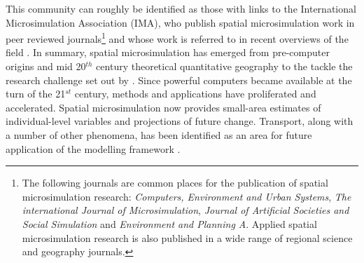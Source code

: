 This community can roughly be identified as those with links
to the International Microsimulation Association (IMA), 
who publish spatial microsimulation work in peer reviewed
journals\footnote{The following journals are common places for the
publication of spatial microsimulation research:
\emph{Computers, Environment and Urban Systems},
\emph{The international Journal of Microsimulation},
\emph{Journal of Artificial Societies and Social Simulation} and
\emph{Environment and Planning A}. Applied spatial microsimulation
research is also published in a wide range of regional science
and geography journals.
}
and whose work is referred to in recent overviews of the field
\citep{Tanton2013, O'Donoghue2013}.
In summary, spatial microsimulation has emerged
from pre-computer origins and mid 20$^{th}$ century theoretical quantitative
geography to the tackle the research challenge set out by
\citet{Holm1987}. Since powerful computers became available at the turn
of the 21$^{st}$ century, methods and applications have
proliferated and accelerated. Spatial microsimulation now
provides small-area estimates
of individual-level variables and projections of future change.
Transport, along with a number of other phenomena, has been
identified as an area for future application of the modelling framework
\citep{clarke2013conclusions}.
% 
